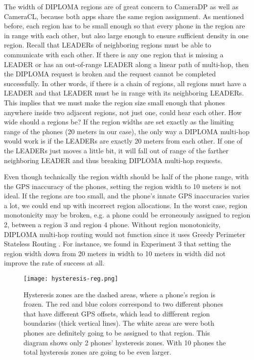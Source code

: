 The width of DIPLOMA regions are of great concern to CameraDP as well as CameraCL, because both apps share the same region assignment. As mentioned before, each region has to be small enough so that every phone in the region are in range with each other, but also large enough to ensure sufficient density in one region. Recall that LEADERs of neighboring regions must be able to communicate with each other. If there is any one region that is missing a LEADER or has an out-of-range LEADER along a linear path of multi-hop, then the DIPLOMA request is broken and the request cannot be completed successfully. In other words, if there is a chain of regions, all regions must have a LEADER and that LEADER must be in range with its neighboring LEADERs. This implies that we must make the region size small enough that phones anywhere inside two adjacent regions, not just one, could hear each other.  How wide should a regions be? If the region widths are set exactly as the limiting range of the phones (20 meters in our case), the only way a DIPLOMA multi-hop would work is if the LEADERs are exactly 20 meters from each other. If one of the LEADERs just moves a little bit, it will fall out of range of the farther neighboring LEADER and thus breaking DIPLOMA multi-hop requests.

Even though technically the region width should be half of the phone range, with the GPS inaccuracy of the phones, setting the region width to 10 meters is not ideal. If the regions are too small, and the phone's innate GPS inaccuracies varies a lot, we could end up with incorrect region allocations. In the worst case, region monotonicity may be broken, e.g. a phone could be erroneously assigned to region 2, between a region 3 and region 4 phone. Without region monotonicity, DIPLOMA multi-hop routing would not function since it uses Greedy Perimeter Stateless Routing \cite{gpsr}. For instance, we found in Experiment 3 that setting the region width down from 20 meters in width to 10 meters in width did not improve the rate of success at all.

\begin{figure}[htb]
\begin{center}
\texttt{[image: hysteresis-reg.png]}
\caption{Hysteresis zones are the dashed areas, where a phone's region is frozen. The red and blue colors correspond to two different phones that have different GPS offsets, which lead to diffferent region boundaries (thick vertical lines). The white areas are were both phones are definitely going to be assigned to that region. This diagram shows only 2 phones' hysteresis zones. With 10 phones the total hysteresis zones are going to be even larger.}
\label{fig:hysteresis-png}
\end{center}
\end{figure}

